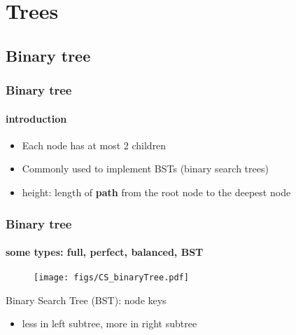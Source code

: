 \section{Trees}

\subsection{Binary tree}
\begin{frame}
\frametitle{Binary tree}
\framesubtitle{introduction}
\logoEvolution\mypagenum
	\begin{itemize}
		\item Each node has at most 2 children
		\item Commonly used to implement BSTs (binary search trees)
		\item {\color{red}height}: length of \textbf{path} from the root node to the deepest node
	\end{itemize}
\end{frame}




\begin{frame}
\frametitle{Binary tree}
\framesubtitle{some types: full, perfect, balanced, BST}
\logoEvolution\mypagenum
	\begin{figure}				
		\texttt{[image: figs/CS\_binaryTree.pdf]}
	\end{figure}	
	{\color{red}Binary Search Tree (BST)}: node keys
		\begin{itemize}
			\item less in left subtree, more in right subtree
		\end{itemize}
\end{frame}













